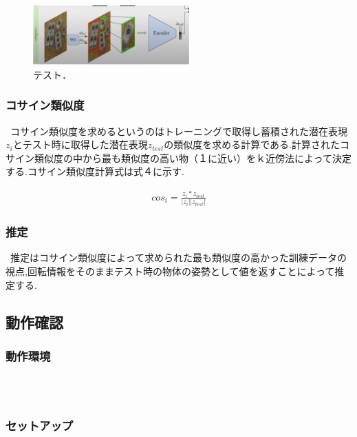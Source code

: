 \documentclass[11pt,a4j,ascmac]{jarticle}
\begin{document}
    \begin{figure}[htpp]
     \centering
      \includegraphics[width=60mm]{pic6.eps}
      \vspace*{30mm}
      \caption{テスト．}
      \label{fig:2d_pose_estimation}
      \end{figure}


\subsubsection{コサイン類似度}

\ コサイン類似度を求めるというのはトレーニングで取得し蓄積された潜在表現$ z_i $とテスト時に取得した潜在表現$z_{test}$の類似度を求める計算である.計算されたコサイン類似度の中から最も類似度の高い物（１に近い）をｋ近傍法によって決定する.コサイン類似度計算式は式４に示す.

\begin{eqnarray}
\label{eq:polynomial1}
cos_i = \frac {z_i * z_{test}}{|z_i||z_{test}|}
\end{eqnarray}


\subsubsection{推定}
\ 推定はコサイン類似度によって求められた最も類似度の高かった訓練データの視点,回転情報をそのままテスト時の物体の姿勢として値を返すことによって推定する.


\subsection{動作確認}


\subsubsection{動作環境}
\    \\ 
\    \\


\subsubsection{セットアップ}
\end{document}
